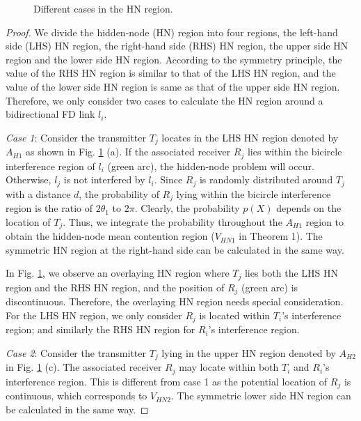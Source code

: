 \documentclass[conference]{IEEEtran}
\theoremstyle{plain}
\begin{document}
\begin{appendices}
\begin{figure}[htbp] 
\centering   
{}


\caption{Different cases in the HN region.}
\label{proof_MCR}
\end{figure}

\begin{proof}
We divide the hidden-node (HN) region into four regions, the left-hand side (LHS) HN region, the right-hand side (RHS) HN region, the upper side HN region and the lower side HN region. According to the symmetry principle, the value of the RHS HN region is similar to that of the LHS HN region, and the value of the lower side HN region is same as that of the upper side HN region. Therefore, we only consider two cases to calculate the HN region around a bidirectional FD link $l_i$.

\emph{Case 1}: Consider the transmitter $T_j$ locates in the LHS HN region denoted by $A_{H1}$ as shown in Fig. \ref{proof_MCR} (a). If the associated receiver $R_j$ lies within the bicircle interference region of $l_i$ (green arc), the hidden-node problem will occur. Otherwise, $l_j$ is not interfered by $l_i$. Since $R_j$ is randomly distributed around $T_j$ with a distance $d$, the probability of $R_j$ lying within the bicircle interference region is the ratio of $2\theta_1$ to $2\pi$. Clearly, the probability $p(X)$ depends on the location of $T_j$. Thus, we integrate the probability throughout the $A_{H1}$ region to obtain the hidden-node mean contention region ($V_{HN1}$ in Theorem 1). The symmetric HN region at the right-hand side can be calculated in the same way.

In Fig. \ref{proof_MCR}, we observe an overlaying HN region where $T_j$ lies both the LHS HN region and the RHS HN region, and the position of $R_j$ (green arc) is discontinuous. Therefore, the overlaying HN region needs special consideration. For the LHS HN region, we only consider $R_j$ is located within $T_i$'s interference region; and similarly the RHS HN region for $R_i$'s interference region.

\emph{Case 2}: Consider the transmitter $T_j$ lying in the upper HN region denoted by $A_{H2}$ in Fig. \ref{proof_MCR} (c). The associated receiver $R_j$ may locate within both $T_i$ and $R_i$'s interference region. This is different from case 1 as the potential location of $R_j$ is continuous, which corresponds to $V_{HN2}$. The symmetric lower side HN region can be calculated in the same way.


\end{proof}
\end{appendices}
\end{document}
